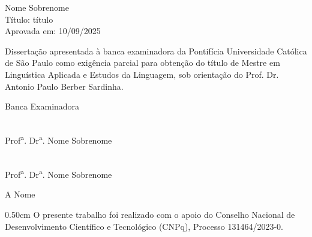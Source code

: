 \begin{titlepage}
    Nome Sobrenome \\
    Título: título \\
    Aprovada em: 10/09/2025

    \vspace{2cm}
    Dissertação apresentada à banca examinadora da Pontifícia Universidade Católica de São Paulo como exigência parcial para obtenção do título de Mestre em Linguística Aplicada e Estudos da Linguagem, sob orientação do Prof. Dr. Antonio Paulo Berber Sardinha.

    \vspace{4cm}
    Banca Examinadora

    \vspace{3cm}
    \makebox[0.75\textwidth]{\hrulefill} \\
    Prof\textsuperscript{a}. Dr\textsuperscript{a}. Nome Sobrenome

    \vspace{3cm}
    \makebox[0.75\textwidth]{\hrulefill} \\
    Prof\textsuperscript{a}. Dr\textsuperscript{a}. Nome Sobrenome

\end{titlepage}

\begin{titlepage}
    \begin{center}
        \vspace*{11cm}
        {A Nome}
        \vfill
    \end{center}
\end{titlepage}

\begin{titlepage}
    \vspace*{10cm}
    \begin{adjustwidth}{0.5\textwidth}{0cm}
        O presente trabalho foi realizado com o apoio do Conselho Nacional de Desenvolvimento Científico e Tecnológico (CNPq), Processo 131464/2023-0.
    \end{adjustwidth}
\end{titlepage}


